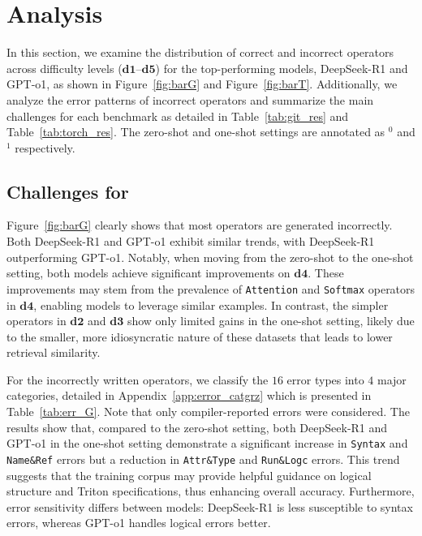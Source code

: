 \section{Analysis}

In this section, we examine the distribution of correct and incorrect operators across difficulty levels ($\mathbf{d1}$–$\mathbf{d5}$) for the top-performing models, DeepSeek-R1 and GPT-o1, as shown in Figure~\ref{fig:barG} and Figure~\ref{fig:barT}. Additionally, we analyze the error patterns of incorrect operators and summarize the main challenges for each benchmark as detailed in Table~\ref{tab:git_res} and Table~\ref{tab:torch_res}.
The zero-shot and one-shot settings are annotated as $^0$ and $^1$ respectively.


\subsection{Challenges for \benchone}

Figure~\ref{fig:barG} clearly shows that most operators are generated incorrectly. 
Both DeepSeek-R1 and GPT-o1 exhibit similar trends, with DeepSeek-R1 outperforming GPT-o1.
Notably, when moving from the zero-shot to the one-shot setting, both models achieve significant improvements on $\mathbf{d4}$.
These improvements may stem from the prevalence of \texttt{Attention} and \texttt{Softmax} operators in $\mathbf{d4}$, enabling models to leverage similar examples. 
In contrast, the simpler operators in $\mathbf{d2}$ and $\mathbf{d3}$ show only limited gains in the one-shot setting, likely due to the smaller, more idiosyncratic nature of these datasets that leads to lower retrieval similarity. 


For the incorrectly written operators, we classify the $16$ error types into $4$ major categories, detailed in Appendix~\ref{app:error_catgrz}
which is presented in Table~\ref{tab:err_G}.
Note that only compiler-reported errors were considered.
The results show that, compared to the zero-shot setting, both DeepSeek-R1 and GPT-o1 in the one-shot setting demonstrate a significant increase in \texttt{Syntax} and \texttt{Name\&Ref} errors but a reduction in \texttt{Attr\&Type} and \texttt{Run\&Logc} errors. 
This trend suggests that the training corpus may provide helpful guidance on logical structure and Triton specifications, thus enhancing overall accuracy.
Furthermore, error sensitivity differs between models: DeepSeek-R1 is less susceptible to syntax errors, whereas GPT-o1 handles logical errors better.



